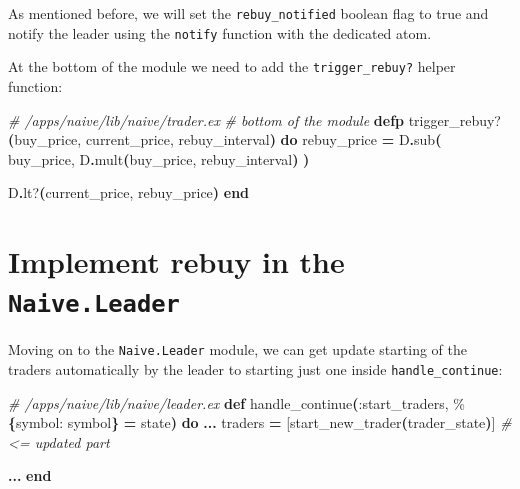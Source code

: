 \documentclass[
  oneside]{book}
\newenvironment{Shaded}{\begin{snugshade}}{\end{snugshade}}
\newcommand{\CommentTok}[1]{\textcolor[rgb]{0.56,0.35,0.01}{\textit{#1}}}
\newcommand{\FunctionTok}[1]{\textcolor[rgb]{0.13,0.29,0.53}{\textbf{#1}}}
\newcommand{\KeywordTok}[1]{\textcolor[rgb]{0.13,0.29,0.53}{\textbf{#1}}}
\newcommand{\NormalTok}[1]{#1}
\newcommand{\OperatorTok}[1]{\textcolor[rgb]{0.81,0.36,0.00}{\textbf{#1}}}
\newcommand{\OtherTok}[1]{\textcolor[rgb]{0.56,0.35,0.01}{#1}}
\newcommand{\VariableTok}[1]{\textcolor[rgb]{0.00,0.00,0.00}{#1}}
\begin{document}
As mentioned before, we will set the \texttt{rebuy\_notified} boolean flag to true and notify the leader using the \texttt{notify} function with the dedicated atom.

At the bottom of the module we need to add the \texttt{trigger\_rebuy?} helper function:

\begin{Shaded}
\begin{Highlighting}[]
  \CommentTok{\# /apps/naive/lib/naive/trader.ex}
  \CommentTok{\# bottom of the module}
  \KeywordTok{defp}\NormalTok{ trigger\_rebuy?}\FunctionTok{(}\NormalTok{buy\_price, current\_price, rebuy\_interval}\FunctionTok{)} \KeywordTok{do}
\NormalTok{    rebuy\_price }\OperatorTok{=}
\NormalTok{      D}\OperatorTok{.}\NormalTok{sub}\FunctionTok{(}
\NormalTok{        buy\_price,}
\NormalTok{        D}\OperatorTok{.}\NormalTok{mult}\FunctionTok{(}\NormalTok{buy\_price, rebuy\_interval}\FunctionTok{)}
      \FunctionTok{)}

\NormalTok{    D}\OperatorTok{.}\NormalTok{lt?}\FunctionTok{(}\NormalTok{current\_price, rebuy\_price}\FunctionTok{)}
  \KeywordTok{end}
\end{Highlighting}
\end{Shaded}

\section{\texorpdfstring{Implement rebuy in the \texttt{Naive.Leader}}{Implement rebuy in the Naive.Leader}}\label{implement-rebuy-in-the-naive.leader}

Moving on to the \texttt{Naive.Leader} module, we can get update starting of the traders automatically by the leader to starting just one inside \texttt{handle\_continue}:

\begin{Shaded}
\begin{Highlighting}[]
  \CommentTok{\# /apps/naive/lib/naive/leader.ex}
  \KeywordTok{def}\NormalTok{ handle\_continue}\FunctionTok{(}\VariableTok{:start\_traders}\NormalTok{, \%}\FunctionTok{\{}\VariableTok{symbol:}\NormalTok{ symbol}\FunctionTok{\}} \OperatorTok{=}\NormalTok{ state}\FunctionTok{)} \KeywordTok{do}
    \OperatorTok{...}
\NormalTok{    traders }\OperatorTok{=} \OtherTok{[}\NormalTok{start\_new\_trader}\FunctionTok{(}\NormalTok{trader\_state}\FunctionTok{)}\OtherTok{]} \CommentTok{\# \textless{}= updated part}

    \OperatorTok{...}
  \KeywordTok{end}
\end{Highlighting}
\end{Shaded}
\end{document}

